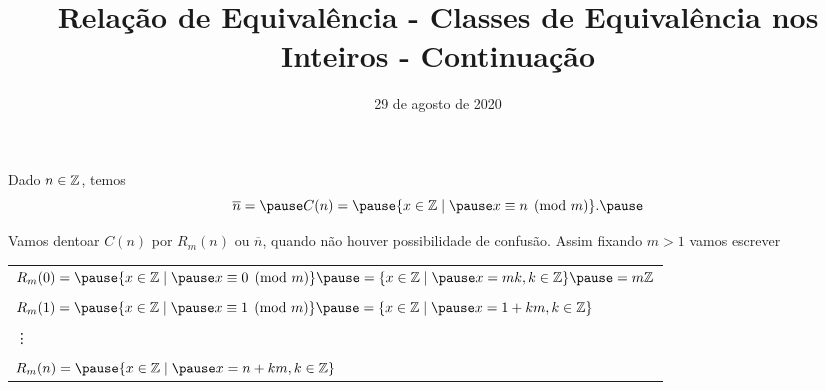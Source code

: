 \documentclass{beamer}
\title{Rela\c{c}\~ao de Equival\^encia - Classes de Equival\^encia nos Inteiros - Continua\c{c}\~ao}
\author[\autor]{\autor}
\institute[\instituto]{\instituto}
\date{29 de agosto de 2020}
\begin{document}
    \begin{frame}
        \maketitle
    \end{frame}


    \begin{frame}
        Dado $n \in \mathbb{Z}$, temos\pause
        \[
            \overline{n} = \pause C(n) = \pause \{x \in \z \mid \pause x\equiv n \pmod{m}\}.\pause
        \]

        Vamos dentoar $C(n)$ \pause por $R_{m}(n)$ \pause ou $\overline{n}$, \pause quando n{\~a}o houver possibilidade de confus{\~a}o. \pause Assim fixando $m > 1$ vamos escrever\pause
        \begin{center}
            \begin{tabular}{l}
                $R_{m}(0) = \pause \{x \in \z \mid \pause x\equiv 0 \pmod{m}\} \pause =\{x \in \z \mid \pause x = mk, k \in \z\}\pause = m\z$\pause\\
                \\
                $R_{m}(1) = \pause \{x \in \z \mid \pause x\equiv 1 \pmod{m}\} \pause = \{x \in \z \mid \pause x = 1 + km, k \in \z \}$\pause \\
                \\
                \vdots\\
                \\
                $R_{m}(n) = \pause \{x \in \z \mid \pause x = n + km, k \in \z \}$\pause    
            \end{tabular}
            
        \end{center}
    \end{frame}
\end{document}

